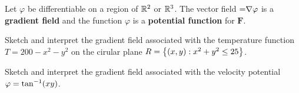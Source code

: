 \documentclass[../mathNotesPreamble]{subfiles}
\begin{document}
  \pagebreak

  \begin{defn*}
    Let $\varphi$ be differentiable on a region of $\mathbb{R}^2$ or $\mathbb{R}^3$. The vector field $\mathbf =\nabla \varphi$ is a \textbf{gradient field} and the function $\varphi$ is a \textbf{potential function} for $\mathbf F$.
  \end{defn*}

  \begin{ex*}
    Sketch and interpret the gradient field associated with the temperature function $T=200-x^2-y^2$ on the cirular plane $R={\left\{(x,y): x^2+y^2\leq 25\right\}}$.
  \end{ex*}
  \begin{ex*}
    Sketch and interpret the gradient field associated with the velocity potential $\varphi=\tan^{-1}(xy)$.
  \end{ex*}
  \pagebreak
  
\end{document}

